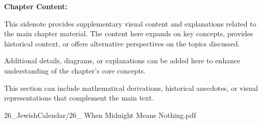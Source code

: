 \begin{SideNotePage}{
  \textbf{Chapter Content:} \par
  This sidenote provides supplementary visual content and explanations related to the main chapter material. The content here expands on key concepts, provides historical context, or offers alternative perspectives on the topics discussed.

  \vspace{0.5em}
  Additional details, diagrams, or explanations can be added here to enhance understanding of the chapter's core concepts.

  \vspace{0.5em}
  This section can include mathematical derivations, historical anecdotes, or visual representations that complement the main text.
}{26_JewishCalendar/26_ When Midnight Means Nothing.pdf}
\end{SideNotePage}
